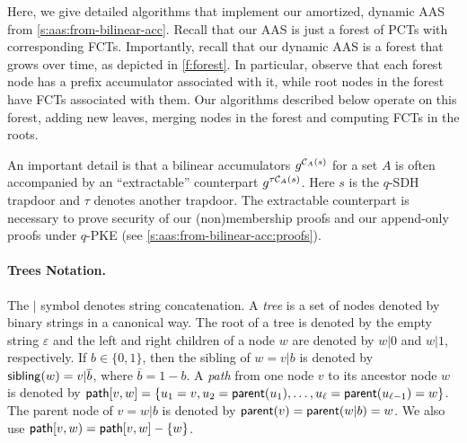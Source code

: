 Here, we give detailed algorithms that implement our amortized, dynamic AAS from \cref{s:aas:from-bilinear-acc}.
Recall that our AAS is just a forest of PCTs with corresponding FCTs.
Importantly, recall that our dynamic AAS is a forest that grows over time, as depicted in \cref{f:forest}.
In particular, observe that each forest node has a prefix accumulator associated with it, while root nodes in the forest have FCTs associated with them.
Our algorithms described below operate on this forest, adding new leaves, merging nodes in the forest and computing FCTs in the roots.

An important detail is that a bilinear accumulators $g^{\mathcal{C}_A(s)}$ for a set $A$ is often accompanied by an ``extractable'' counterpart $g^{\tau \mathcal{C}_A(s)}$.
Here $s$ is the $q$-SDH trapdoor and $\tau$ denotes another trapdoor.
The extractable counterpart is necessary to prove security of our (non)membership proofs and our append-only proofs under $q$-PKE (see \cref{s:aas:from-bilinear-acc:proofs}).

\paragraph{Trees Notation.}
\label{s:prelim:notation:trees}
The $|$ symbol denotes string concatenation.
A \textit{tree} is a set of nodes denoted by binary strings in a canonical way.
The root of a tree is denoted by the empty string $\varepsilon$ and the left and right children of a node $w$ are denoted by $w|0$ and $w|1$, respectively.
If $b\in\{0,1\}$, then the sibling of $w = v|b$ is denoted by $\mathsf{sibling}(w) = v|\overline{b}$, where $\overline{b} = 1-b$.
A \emph{path} from one node $v$ to its ancestor node $w$ is denoted by $\mathsf{path}[v,w] = \{u_1 = v, u_2 = \mathsf{parent}(u_1), \dots, u_\ell = \mathsf{parent}(u_{\ell-1}) = w\}$.
The parent node of $v = w|b$ is denoted by $\mathsf{parent}(v) = \mathsf{parent}(w|b) = w$.
We also use $\mathsf{path}[v,w) = \mathsf{path}[v,w]-\{w\}$.

